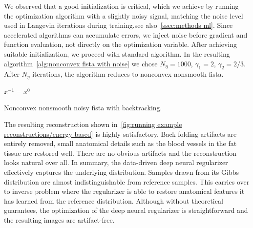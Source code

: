 We observed that a good initialization is critical, which we achieve by running the optimization algorithm with a slightly noisy signal, matching the noise level used in Langevin iterations during training.see also~\cref{ssec:methods ml}.
Since accelerated algorithms can accumulate errors, we inject noise before gradient and function evaluation, not directly on the optimization variable.
After achieving suitable initialization, we proceed with standard algorithm.
In the resulting algorithm~\cref{alg:nonconvex fista with noise} we chose \( N_\eta = \num{1000} \), \( \gamma_{\num{1}} = \num{2} \), \( \gamma_{\num{2}} = \num{2}/\num{3} \).
After \( N_\eta \) iterations, the algorithm reduces to nonconvex nonsmooth \gls{fista}.
\begin{algorithm}
	\DontPrintSemicolon%
	\( x^{-1} = x^{\num{0}} \)\;
	\caption{Nonconvex nonsmooth noisy \gls{fista} with backtracking.}%
	\label{alg:nonconvex fista with noise}
\end{algorithm}

The resulting reconstruction shown in~\cref{fig:running example reconstructions/energy-based} is highly satisfactory.
Back-folding artifacts are entirely removed, small anatomical details such as the blood vessels in the fat tissue are restored well.
There are no obvious artifacts and the reconstruction looks natural over all.
In summary, the data-driven deep neural regularizer effectively captures the underlying distribution.
Samples drawn from its Gibbs distribution are almost indistinguishable from reference samples.
This carries over to inverse problem where the regularizer is able to restore anatomical features it has learned from the reference distribution.
Although without theoretical guarantees, the optimization of the deep neural regularizer is straightforward and the resulting images are artifact-free.

